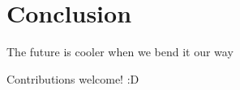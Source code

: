 \section{Conclusion}

\begin{frame}{The future is cooler when we bend it our way}

Contributions welcome! :D

\end{frame}